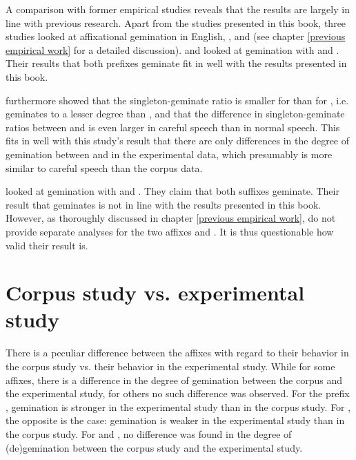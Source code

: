 A comparison with former empirical studies reveals that the results are largely in line with previous research. 
Apart from the studies presented in this book, three studies looked at affixational gemination in English, \cite{Kaye.2005}, \cite{Oh.2012} and \cite{Kotzor.2016} (see chapter \ref{previous empirical work} for a detailed discussion). 
\cite{Kaye.2005} and \cite{Oh.2012} looked at gemination with  and . Their results that both prefixes geminate fit in well with the results presented in this book.

\cite{Oh.2012} furthermore showed that the singleton-geminate ratio is smaller for  than for , i.e.  geminates to a lesser degree than , and that the difference in singleton-geminate ratios between  and  is even larger in careful speech than in normal speech. 
This fits in well with this study's result that there are only differences in the degree of gemination between  and  in the experimental data, which presumably is more similar to careful speech than the corpus data.

\cite{Kotzor.2016} looked at gemination with  and . They claim that both suffixes geminate. Their result that  geminates is not in line with the results presented in this book. However, as thoroughly discussed in chapter \ref{previous empirical work}, \cite{Kotzor.2016} do not provide separate analyses for the two affixes  and . It is thus questionable how valid their result is. 


\section{Corpus study vs. experimental study}


There is a peculiar difference between the affixes with regard to their behavior in the corpus study vs. their behavior in the experimental study.
While for some affixes, there is a difference in the degree of gemination between the corpus and the experimental study, for others no such difference was observed. For the prefix , gemination is stronger in the experimental study than in the corpus study. For , the opposite is the case: gemination is weaker in the experimental study than in the corpus study. For  and , no difference was found in the degree of (de)gemination between the corpus study and the experimental study.

